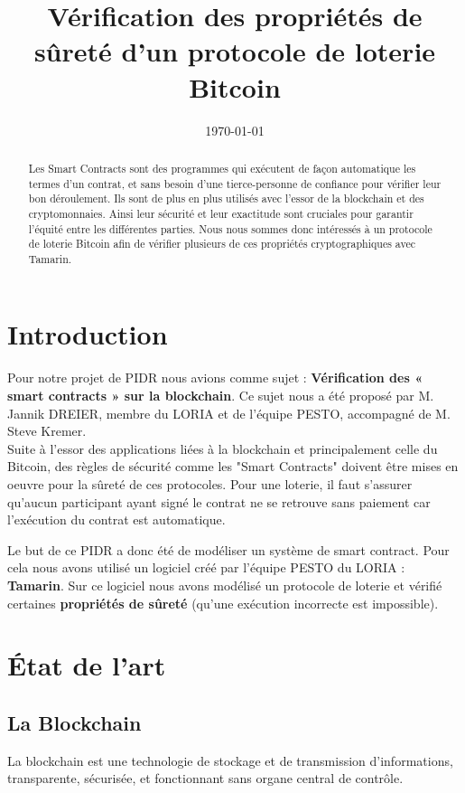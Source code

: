 \documentclass[conference]{IEEEtran}
\title{Vérification des propriétés de sûreté d'un protocole de loterie Bitcoin}
\author{\IEEEauthorblockN{Guillaume Stunault}
\IEEEauthorblockA{Etudiant \\ Telecom Nancy}
\and \IEEEauthorblockN{Lucas Vignali} 
\IEEEauthorblockA{Etudiant \\ Telecom Nancy} }
\date{\today}
\begin{document}
\maketitle
\begin{abstract}
Les Smart Contracts sont des programmes qui exécutent de façon automatique les termes d'un contrat, et sans besoin d'une tierce-personne de confiance pour vérifier leur bon déroulement.\cite{ethercontract}
Ils sont de plus en plus utilisés avec l'essor de la blockchain et des cryptomonnaies. Ainsi leur sécurité et leur exactitude sont cruciales pour garantir l'équité entre les différentes parties.\cite{bcfr-smart, smartdeloitte}
Nous nous sommes donc intéressés à un protocole de loterie Bitcoin \cite{955} afin de vérifier plusieurs de ces propriétés cryptographiques avec Tamarin\cite{tamarin}.
\end{abstract}
\section{Introduction}

Pour notre projet de PIDR nous avions comme sujet : \textbf{Vérification des « smart contracts » sur la blockchain}. Ce sujet nous a été proposé par M. Jannik DREIER, membre du LORIA et de l'équipe PESTO, accompagné de M. Steve Kremer. \\Suite à l'essor des applications liées à la blockchain et principalement celle du Bitcoin, des règles de sécurité comme les "Smart Contracts" doivent être mises en oeuvre pour la sûreté de ces protocoles.  Pour une loterie, il faut s'assurer qu'aucun participant ayant signé le contrat ne se retrouve sans paiement car l'exécution du contrat est automatique. 

Le but de ce PIDR a donc été de modéliser un système de smart contract. Pour cela nous avons utilisé un logiciel créé par l'équipe PESTO du LORIA : \textbf{Tamarin}\cite{tamarin}. Sur ce logiciel nous avons modélisé un protocole de loterie et vérifié certaines \textbf{propriétés de sûreté} (qu'une exécution incorrecte est impossible).
\newpage
\section{État de l'art}
\subsection{La Blockchain}
La blockchain est une technologie de stockage et de transmission d’informations, transparente, sécurisée, et fonctionnant sans organe central de contrôle.
\end{document}

